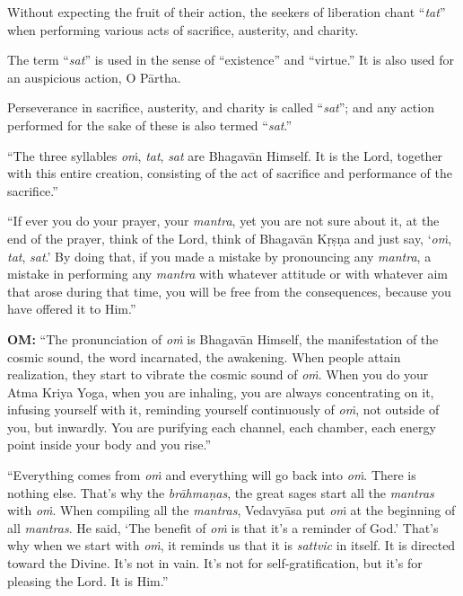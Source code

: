 {Without expecting the fruit of their action, the seekers of liberation chant \enquote{\textit{tat}} when performing various acts of sacrifice, austerity, and charity.}

{The term \enquote{\textit{sat}} is used in the sense of \enquote{existence} and \enquote{virtue.} It is also used for an auspicious action, O Pārtha.}

{Perseverance in sacrifice, austerity, and charity is called \enquote{\textit{sat}}; and any action performed for the sake of these is also termed \enquote{\textit{sat}.}}

\enquote{The three syllables \textit{oṁ}, \textit{tat}, \textit{sat} are Bhagavān Himself. It is the Lord, together with this entire creation, consisting of the act of sacrifice and performance of the sacrifice.}

\enquote{If ever you do your prayer, your \textit{mantra}, yet you are not sure about it, at the end of the prayer, think of the Lord, think of Bhagavān Kṛṣṇa and just say, \enquote{\textit{oṁ}, \textit{tat}, \textit{sat}.} By doing that, if you made a mistake by pronouncing any \textit{mantra}, a mistake in performing any \textit{mantra} with whatever attitude or with whatever aim that arose during that time, you will be free from the consequences, because you have offered it to Him.}


\textbf{OṀ:} \enquote{The pronunciation of \textit{oṁ} is Bhagavān Himself, the manifestation of the cosmic sound, the word incarnated, the awakening. When people attain realization, they start to vibrate the cosmic sound of \textit{oṁ}. When you do your Atma Kriya Yoga, when you are inhaling, you are always concentrating on it, infusing yourself with it, reminding yourself continuously of \textit{oṁ}, not outside of you, but inwardly. You are purifying each channel, each chamber, each energy point inside your body and you rise.}

\enquote{Everything comes from \textit{oṁ} and everything will go back into \textit{oṁ}. There is nothing else. That’s why the \textit{brāhmaṇas}, the great sages start all the \textit{mantras} with \textit{oṁ}. When compiling all the \textit{mantras}, Vedavyāsa put \textit{oṁ} at the beginning of all \textit{mantras}. He said, \enquote{The benefit of \textit{oṁ} is that it’s a reminder of God.} That’s why when we start with \textit{oṁ}, it reminds us that it is \textit{sattvic} in itself. It is directed toward the Divine. It’s not in vain. It’s not for self-gratification, but it’s for pleasing the Lord. It is Him.}

